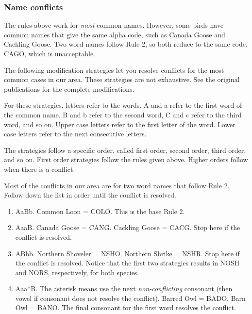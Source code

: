\documentclass[11pt]{article}
\begin{document}
\subsubsection*{Name conflicts}

The rules above work for \emph{most} common names. However, some birds have common names that give the same alpha code, such as Canada Goose and Cackling Goose. Two word names follow Rule 2, so both reduce to the same code, CAGO, which is unacceptable.

The following modification strategies let you resolve conflicts for the most common cases in our area.  These strategies are not exhaustive. See the original publications for the complete modifications.

For these strategies, letters refer to the words. A and a refer to the first word of the common name. B and b refer to the second word, C and c refer to the third word, and so on. Upper case letters refer to the first letter of the word. Lower case letters refer to the next consecutive letters.

The strategies follow a specific order, called first order, second order, third order, and so on. First order strategies follow the rules given above. Higher orders follow when there is a conflict.

Most of the conflicts in our area are for two word names that follow Rule 2. Follow down the list in order until the conflict is resolved.

\begin{enumerate}[label={Order \arabic*:}]
\item AaBb. Common Loon = COLO. This is the base Rule 2.

\item AaaB. Canada Goose = CANG. Cackling Goose = CACG. Stop here if the conflict is resolved.

\item ABbb. Northern Shoveler = NSHO. Northern Shrike = NSHR. Stop here if the conflict is resolved. Notice that the first two strategies results in NOSH and NORS, respectively, for both species. 

\item Aaa*B. The asterisk means use the next \emph{non-conflicting} consonant (then vowel if consonant does not resolve the conflict). Barred Owl = BADO. Barn Owl = BANO. The final consonant for the first word resolves the conflict. 

\end{enumerate}
\end{document}
